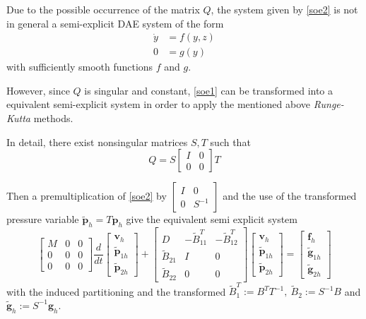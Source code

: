 \documentclass[a4paper,10pt,BCOR=15mm]{scrbook}
\begin{document}
\begin{rem}
 Due to the possible occurrence of the matrix $Q$, the system given by \eqref{soe2} is not in general a semi-explicit DAE system of the form
\begin{equation*}
\begin{split}
 \dot y &= f(y,z) \\
 0 &= g(y)
\end{split}
\end{equation*}
with sufficiently smooth functions $f$ and $g$. 

However, since $Q$ is singular and constant, \eqref{soe1} can be transformed into a equivalent semi-explicit system in order to apply the mentioned above \textit{Runge-Kutta} methods.

In detail, there exist nonsingular matrices $S,T$ such that 
\begin{equation*}
 Q = S\begin{bmatrix} I & 0 \\ 0&0 \end{bmatrix}T
\end{equation*}

Then a premultiplication of \eqref{soe2} by $\begin{bmatrix} I & 0 \\ 0&S^{-1} \end{bmatrix}$ and the use of the transformed pressure variable $\tilde{\mathbf p}_h = T \mathbf p_h $ give the equivalent semi explicit system
\begin{equation*}
	\begin{bmatrix} M& 0 & 0\\0& 0& 0 \\ 0&0&0 \end{bmatrix} \frac{d}{dt}{\begin{bmatrix} \mathbf v_h \\ \tilde {\mathbf p}_{1h} \\ \tilde {\mathbf p}_{2h}  \end{bmatrix}} + \begin{bmatrix} D& -{\tilde B}_{11}^T & -{\tilde B}_{12}^T\\ {\tilde B}_{21} & I & 0 \\ {\tilde B}_{22} &0&0 \end{bmatrix} \begin{bmatrix} \mathbf v_h \\\tilde {\mathbf p}_{1h} \\ \tilde {\mathbf p}_{2h} \end{bmatrix} = \begin{bmatrix} \mathbf f_h \\ \tilde{\mathbf g}_{1h} \\ \tilde{\mathbf g} _{2h} \end{bmatrix} 
\end{equation*}
with the induced partitioning and the transformed $\tilde B_1^T := B^T T^{-1}, ~ \tilde B_2 := S^{-1} B$ and $ \tilde{\mathbf g} _h := S^{-1}\mathbf g_h$.

\end{rem}
\end{document}
